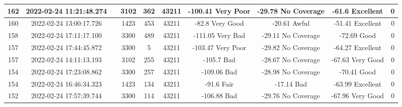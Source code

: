\begin{longtable*}{|c|c|c|c|c|c|c|c|c|c|}
162&2022-02-24 11:21:48.274&&3102&362&43211& -100.41   Very Poor   & -29.78    No Coverage & -61.6     Excellent   & 0\\\hline
{}160&2022-02-24 13:00:17.726&&1423&453&43211& -82.8     Very Good   & -20.61    Awful       & -51.41    Excellent   & 0\\\hline
{}158&2022-02-24 17:11:17.100&&3300&489&43211& -111.05   Very Bad    & -29.11    No Coverage & -72.69    Good        & 0\\\hline
{}157&2022-02-24 17:44:45.872&&3300&5&43211& -103.47   Very Poor   & -29.82    No Coverage & -64.27    Excellent   & 0\\\hline
{}157&2022-02-24 14:11:13.193&&3102&255&43211& -105.7    Bad         & -28.67    No Coverage & -67.63    Very Good   & 0\\\hline
{}154&2022-02-24 17:23:08.862&&3300&257&43211& -109.06   Bad         & -28.98    No Coverage & -70.41    Good        & 0\\\hline
{}154&2022-02-24 16:46:34.323&&1423&134&43211& -91.6     Fair        & -17.14    Bad         & -63.99    Excellent   & 0\\\hline
{}152&2022-02-24 17:57:39.744&&3300&114&43211& -106.88   Bad         & -29.76    No Coverage & -67.96    Very Good   & 0\\\hline

\end{longtable*}
